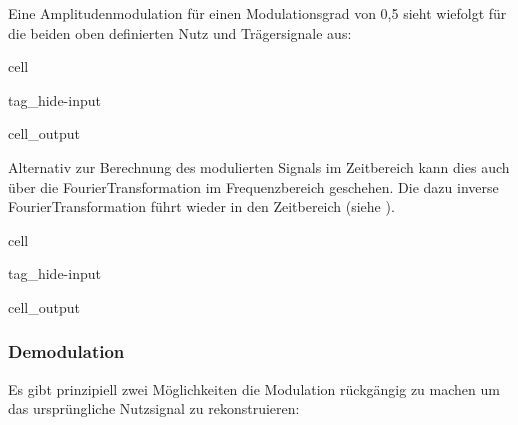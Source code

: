 \documentclass[letterpaper,10pt,english]{jupyterBook}
\begin{document}
\sphinxAtStartPar
Eine Amplitudenmodulation für einen Modulationsgrad von 0,5 sieht wiefolgt für die beiden oben definierten Nutz\sphinxhyphen{} und Trägersignale aus:

\begin{sphinxuseclass}{cell}
\begin{sphinxuseclass}{tag_hide-input}\begin{sphinxVerbatimOutput}

\begin{sphinxuseclass}{cell_output}
\noindent{}

\end{sphinxuseclass}\end{sphinxVerbatimOutput}

\end{sphinxuseclass}
\end{sphinxuseclass}
\sphinxAtStartPar
Alternativ zur Berechnung des modulierten Signals im Zeitbereich kann dies auch über die Fourier\sphinxhyphen{}Transformation im Frequenzbereich geschehen. Die dazu inverse Fourier\sphinxhyphen{}Transformation führt wieder in den Zeitbereich (siehe {\hyperref[\detokenize{content/3_FourierAnalyse::doc}]{}}).

\begin{sphinxuseclass}{cell}
\begin{sphinxuseclass}{tag_hide-input}\begin{sphinxVerbatimOutput}

\begin{sphinxuseclass}{cell_output}
\noindent{}

\end{sphinxuseclass}\end{sphinxVerbatimOutput}

\end{sphinxuseclass}
\end{sphinxuseclass}

\subsubsection{Demodulation}
\label{\detokenize{content/3_Modulationen:demodulation}}
\sphinxAtStartPar
Es gibt prinzipiell zwei Möglichkeiten die Modulation rückgängig zu machen um das ursprüngliche Nutzsignal zu rekonstruieren:
\end{document}
